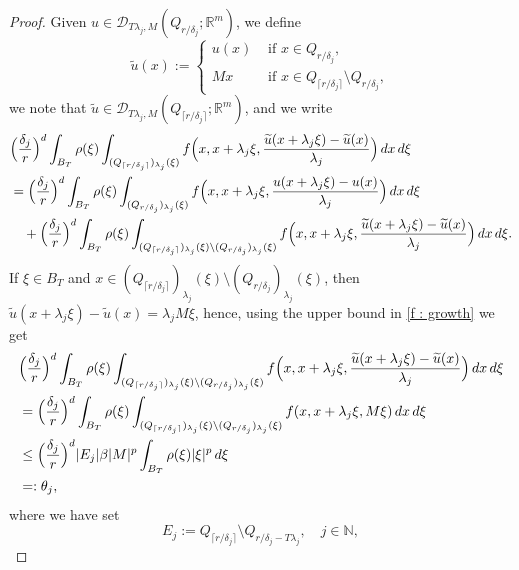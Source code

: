 \documentclass{article}
\theoremstyle{definition}
\newcommand{\dej}{\delta_j}
\newcommand{\N}{\mathbb{N}}
\newcommand{\R}{\mathbb{R}}
\begin{document}
\begin{proof}
Given $u\in \mathcal{D}_{T\lambda_j,M}(Q_{r/\dej}; \R^m)$, we define
\begin{equation*}
    \widetilde{u}(x):=
    \begin{cases}
        u(x) & \text{ if } x\in Q_{r/\dej}, \\
        Mx & \text{ if } x\in Q_{\lceil r/\dej\rceil}\setminus Q_{r/\dej},
    \end{cases}
\end{equation*}
we note that $\widetilde{u}\in \mathcal{D}_{T\lambda_j,M}(Q_{\lceil r/\dej\rceil}; \R^m)$, and we write
\begin{align*}
    &\Bigl(\frac{\dej}{r}\Bigr)^d\int_{B_T} \rho(\xi)\int_{(Q_{\lceil r/\dej \rceil })_{\lambda_j}(\xi)} f\Bigl(x, x+\lambda_j\xi, \frac{\widetilde{u}(x+\lambda_j\xi)-\widetilde{u}(x)}{\lambda_j}\Bigr)\, dx\,d\xi \\
    & = \Bigl(\frac{\dej}{r}\Bigr)^d\int_{B_T} \rho(\xi)\int_{(Q_{r/\dej})_{\lambda_j}(\xi)} f\Bigl(x, x+\lambda_j\xi, \frac{u(x+\lambda_j\xi)-u(x)}{\lambda_j}\Bigr)\, dx\,d\xi \\
    & \quad + \Bigl(\frac{\dej}{r}\Bigr)^d\int_{B_T} \rho(\xi)\int_{(Q_{\lceil r/\dej \rceil })_{\lambda_j}(\xi) \setminus (Q_{r/\dej})_{\lambda_j}(\xi)} f\Bigl(x, x+\lambda_j\xi, \frac{\widetilde{u}(x+\lambda_j\xi)-\widetilde{u}(x)}{\lambda_j}\Bigr)\, dx\,d\xi.
\end{align*}
If $\xi\in B_T$ and $x\in (Q_{\lceil r/\dej \rceil })_{\lambda_j}(\xi) \setminus (Q_{r/\dej})_{\lambda_j}(\xi)$, then $\widetilde{u}(x+\lambda_j\xi)-\widetilde{u}(x)=\lambda_j M\xi$, hence, using the upper bound in \eqref{f : growth} we get
\begin{align} \nonumber
 & \Bigl(\frac{\dej}{r}\Bigr)^d\int_{B_T} \rho(\xi)\int_{(Q_{\lceil r/\dej \rceil })_{\lambda_j}(\xi) \setminus (Q_{r/\dej})_{\lambda_j}(\xi)} f\Bigl(x, x+\lambda_j\xi, \frac{\widetilde{u}(x+\lambda_j\xi)-\widetilde{u}(x)}{\lambda_j}\Bigr)\, dx\,d\xi \\ \nonumber
    & = \Bigl(\frac{\dej}{r}\Bigr)^d\int_{B_T} \rho(\xi)\int_{(Q_{\lceil r/\dej \rceil })_{\lambda_j}(\xi) \setminus (Q_{r/\dej})_{\lambda_j}(\xi)} f(x, x+\lambda_j\xi, M\xi)\, dx\,d\xi \\ \nonumber
    & \leq  \Bigl(\frac{\dej}{r}\Bigr)^d|E_j|\beta|M|^p\int_{B_T} \rho(\xi)|\xi|^p \, d\xi \\ \nonumber
    & =: \theta_j,
\end{align}
where we have set
\begin{equation}\label{set}
    E_j:=Q_{\lceil r/\dej \rceil } \setminus Q_{r/\dej-T\lambda_j}, \quad j\in\N,

\end{equation}
\end{proof}
\end{document}
